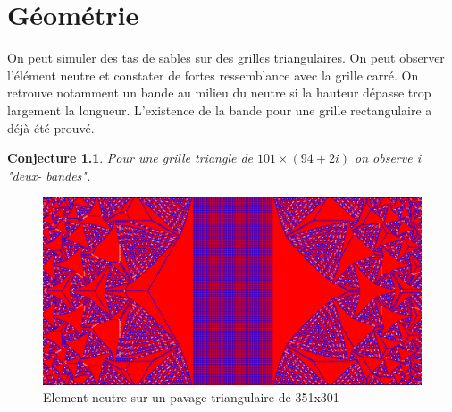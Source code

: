 \documentclass{report}
\newtheorem{conjecture}{Conjecture}
\begin{document}
\chapter{Géométrie}

On peut simuler des tas de sables sur des grilles triangulaires. On peut observer l'élément neutre et constater de fortes ressemblance avec la grille carré. On retrouve notamment un bande au milieu du neutre si la hauteur dépasse trop largement la longueur. L'existence de la bande pour une grille rectangulaire a déjà été prouvé. \cite{geoid}
\begin{conjecture}
Pour une grille triangle de $101 \times (94+2i)$ on observe i "deux- bandes".
\end{conjecture}

\begin{figure}[h]
\begin{center}
\includegraphics[scale=0.25]{351x301_e.png}
\caption{Element neutre sur un pavage triangulaire de 351x301}
\end{center}
\end{figure}




\end{document}
